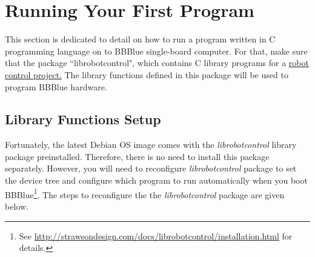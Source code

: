 \section{Running Your First Program}
\label{sec:firstprogram}

This section is dedicated to detail on how to run a program written in C programming language on to BBBlue single-board computer. For that, make sure that the package ``librobotcontrol", which contains C library programs for a \ul{robot control project.} The library functions defined in this package will be used to program BBBlue hardware. 
\subsection{Library Functions Setup}
Fortunately, the latest Debian OS image comes with the \emph{librobotcontrol} library package preinstalled. Therefore, there is no need to install this package separately. However, you will need to reconfigure \emph{librobotcontrol} package to set the device tree and configure which program to run automatically when you boot BBBlue\footnote{See \url{http://strawsondesign.com/docs/librobotcontrol/installation.html} for details.}. The steps to reconfigure the the \emph{librobotcontrol} package are given below. 

